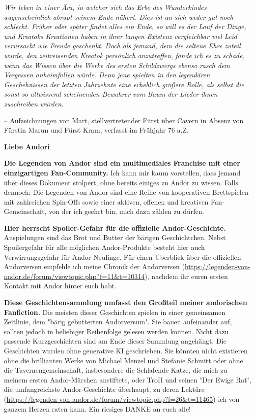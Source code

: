 \documentclass[10pt, a4paper, oneside]{book}
\begin{document}
\textit{Wir leben in einer Ära, in welcher sich das Erbe des Wunderkindes augenscheinlich abrupt seinem Ende nähert. Dies ist an sich weder gut noch schlecht. Früher oder später findet alles ein Ende, so will es der Lauf der Dinge, und Kreatoks Kreationen haben in ihrer langen Existenz vergleichbar viel Leid verursacht wie Freude geschenkt. Doch als jemand, dem die seltene Ehre zuteil wurde, den zeitreisenden Kreatok persönlich anzutreffen, fände ich es zu schade, wenn das Wissen über die Werke des ersten Schildzwergs ebenso rasch dem Vergessen anheimfallen würde. Denn jene spielten in den legendären Geschehnissen der letzten Jahrzehnte eine erheblich größere Rolle, als selbst die sonst so allwissend scheinenden Bewahrer vom Baum der Lieder ihnen zuschreiben würden.}\bigskip

– Aufzeichnungen von Mart, stellvertretender Fürst über Cavern in Absenz von Fürstin Marun und Fürst Kram, verfasst im Frühjahr 76 a.Z.

\vspace*{\fill}

\newpage
\thispagestyle{plain}

\textbf{Liebe Andori} 
\newline

\textbf{Die Legenden von Andor sind ein multimediales Franchise mit einer einzigartigen Fan-Community.} 
Ich kann mir kaum vorstellen, dass jemand über dieses Dokument stolpert, ohne bereits einiges zu Andor zu wissen. Falls dennoch: Die Legenden von Andor sind eine Reihe von kooperativen Brettspielen mit zahlreichen Spin-Offs sowie einer aktiven, offenen und kreativen Fan-Gemeinschaft, von der ich geehrt bin, mich dazu zählen zu dürfen.
\newline

\textbf{Hier herrscht Spoiler-Gefahr für die offizielle Andor-Geschichte.} 
Anspielungen sind das Brot und Butter der bärigen Geschichtchen. Nebst Spoilergefahr für alle möglichen Andor-Produkte besteht hier auch Verwirrungsgefahr für Andor-Neulinge. Für einen Überblick über die offiziellen Andorversen empfehle ich meine Chronik der Andorversen (\url{https://legenden-von-andor.de/forum/viewtopic.php?f=11&t=10314}), nachdem ihr euren ersten Kontakt mit Andor hinter euch habt.
\newline

\textbf{Diese Geschichtensammlung umfasst den Großteil meiner andorischen Fanfiction.} 
Die meisten dieser Geschichten spielen in einer gemeinsamen Zeitlinie, dem "bärig gebutterten Andorversum". Sie bauen aufeinander auf, sollten jedoch in beliebiger Reihenfolge gelesen werden können. Nicht dazu passende Kurzgeschichten sind am Ende dieser Sammlung angehängt.
Die Geschichten wurden ohne generative KI geschrieben. 
Sie könnten nicht existieren ohne die brillianten Werke von Michael Menzel und Stefanie Schmitt oder ohne die Tavernengemeinschaft, insbesondere die Schlafende Katze, die mich zu meinem ersten Andor-Märchen anstiftete, oder TroII und seinen "Der Ewige Rat", die umfangreichste Andor-Geschichte überhaupt, zu deren Lektüre (\url{https://legenden-von-andor.de/forum/viewtopic.php?f=26&t=11465}) ich von ganzem Herzen raten kann. Ein riesiges DANKE an euch alle!
\newline
\end{document}
